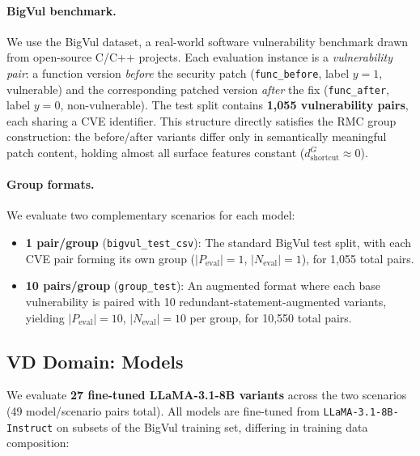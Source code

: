 \documentclass[conference]{IEEEtran}
\theoremstyle{remark}
\newcommand{\shortcutDisc}{d_{\mathrm{shortcut}}^{G}}
\begin{document}
\paragraph{BigVul benchmark.}
We use the BigVul dataset, a real-world software vulnerability benchmark drawn from open-source C/C++ projects.
Each evaluation instance is a \emph{vulnerability pair}: a function version \emph{before} the security patch (\texttt{func\_before}, label $y=1$, vulnerable) and the corresponding patched version \emph{after} the fix (\texttt{func\_after}, label $y=0$, non-vulnerable).
The test split contains \textbf{1,055 vulnerability pairs}, each sharing a CVE identifier.
This structure directly satisfies the RMC group construction: the before/after variants differ only in semantically meaningful patch content, holding almost all surface features constant ($\shortcutDisc\approx 0$).

\paragraph{Group formats.}
We evaluate two complementary scenarios for each model:
\begin{itemize}[leftmargin=*, itemsep=2pt]
\item \textbf{1 pair/group} (\texttt{bigvul\_test\_csv}): The standard BigVul test split, with each CVE pair forming its own group ($|P_{\mathrm{eval}}|=1$, $|N_{\mathrm{eval}}|=1$), for 1,055 total pairs.
\item \textbf{10 pairs/group} (\texttt{group\_test}): An augmented format where each base vulnerability is paired with 10 redundant-statement-augmented variants, yielding $|P_{\mathrm{eval}}|=10$, $|N_{\mathrm{eval}}|=10$ per group, for 10,550 total pairs.
\end{itemize}

\subsection{VD Domain: Models}
\label{sec:vd_models}

We evaluate \textbf{27 fine-tuned LLaMA-3.1-8B variants} across the two scenarios (49 model/scenario pairs total).
All models are fine-tuned from \texttt{LLaMA-3.1-8B-Instruct} on subsets of the BigVul training set, differing in training data composition:
\end{document}

